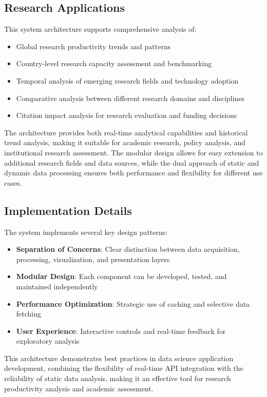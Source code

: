 \subsection{Research Applications}

This system architecture supports comprehensive analysis of:

\begin{itemize}
\item Global research productivity trends and patterns
\item Country-level research capacity assessment and benchmarking
\item Temporal analysis of emerging research fields and technology adoption
\item Comparative analysis between different research domains and disciplines
\item Citation impact analysis for research evaluation and funding decisions
\end{itemize}

The architecture provides both real-time analytical capabilities and historical trend analysis, making it suitable for academic research, policy analysis, and institutional research assessment. The modular design allows for easy extension to additional research fields and data sources, while the dual approach of static and dynamic data processing ensures both performance and flexibility for different use cases.

\subsection{Implementation Details}

The system implements several key design patterns:

\begin{itemize}
\item \textbf{Separation of Concerns}: Clear distinction between data acquisition, processing, visualization, and presentation layers
\item \textbf{Modular Design}: Each component can be developed, tested, and maintained independently
\item \textbf{Performance Optimization}: Strategic use of caching and selective data fetching
\item \textbf{User Experience}: Interactive controls and real-time feedback for exploratory analysis
\end{itemize}

This architecture demonstrates best practices in data science application development, combining the flexibility of real-time API integration with the reliability of static data analysis, making it an effective tool for research productivity analysis and academic assessment. 